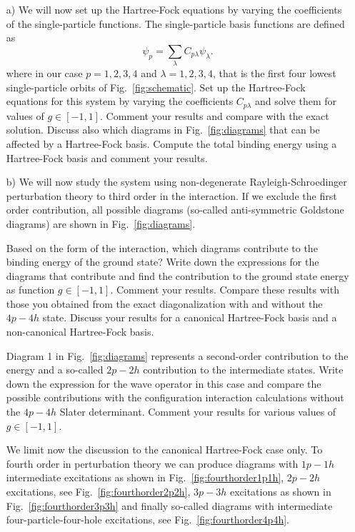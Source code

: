 \begin{prob}\label{problem:prob8.4}
\begin{enumerate}
\item[a)]
We will now set up the Hartree-Fock equations by varying the
coefficients of the single-particle functions. The single-particle
basis functions are defined as
\[
\psi_p = \sum_{\lambda} C_{p\lambda}\psi_{\lambda}.
\]
where in our case $p=1,2,3,4$ and $\lambda=1,2,3,4$, that is the first
four lowest single-particle orbits of Fig.~\ref{fig:schematic}.  Set
up the Hartree-Fock equations for this system by varying the
coefficients $C_{p\lambda}$ and solve them for values of $g\in
[-1,1]$.  Comment your results and compare with the exact
solution. Discuss also which diagrams in Fig.~\ref{fig:diagrams} that
can be affected by a Hartree-Fock basis. Compute the total binding
energy using a Hartree-Fock basis and comment your results.

\item[b)]
We will now study the system using non-degenerate
Rayleigh-Schroedinger perturbation theory to third order in the
interaction.  If we exclude the first order contribution, all possible
diagrams (so-called anti-symmetric Goldstone diagrams) are
shown in Fig.~\ref{fig:diagrams}.


Based on the form of the interaction, which diagrams contribute to the
binding energy of the ground state?  Write down the expressions for
the diagrams that contribute and find the contribution to the ground
state energy as function $g\in [-1,1]$. Comment your results.  Compare
these results with those you obtained from the exact diagonalization with and without the $4p-4h$ state.
Discuss your results for a canonical Hartree-Fock basis and a non-canonical Hartree-Fock basis.


Diagram 1 in Fig.~\ref{fig:diagrams} represents a second-order contribution to the energy and a so-called $2p-2h$ contribution to the intermediate states. Write down the expression for the wave operator in this case and compare the possible contributions with the configuration interaction calculations without the $4p-4h$ Slater determinant. Comment your results for
various values of $g\in [-1,1]$.

We limit now the discussion to the canonical Hartree-Fock case only. To fourth order in perturbation theory we can produce diagrams with $1p-1h$ intermediate excitations as shown in Fig.~\ref{fig:fourthorder1p1h}, $2p-2h$ excitations, see Fig.~\ref{fig:fourthorder2p2h}, $3p-3h$ excitations as shown in Fig.~\ref{fig:fourthorder3p3h} and finally so-called diagrams with intermediate four-particle-four-hole excitations, see Fig.~\ref{fig:fourthorder4p4h}.


\end{enumerate}
\end{prob}
